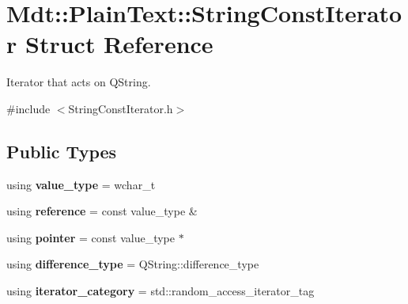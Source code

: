 \hypertarget{struct_mdt_1_1_plain_text_1_1_string_const_iterator}{}\section{Mdt\+:\+:Plain\+Text\+:\+:String\+Const\+Iterator Struct Reference}
\label{struct_mdt_1_1_plain_text_1_1_string_const_iterator}


Iterator that acts on Q\+String.  




{\ttfamily \#include $<$String\+Const\+Iterator.\+h$>$}

\subsection*{Public Types}
\begin{DoxyCompactItemize}
\item 
using {\bfseries value\+\_\+type} = wchar\+\_\+t\hypertarget{struct_mdt_1_1_plain_text_1_1_string_const_iterator_a7e1ae907965f67c75612084704ec088e}{}\label{struct_mdt_1_1_plain_text_1_1_string_const_iterator_a7e1ae907965f67c75612084704ec088e}

\item 
using {\bfseries reference} = const value\+\_\+type \&\hypertarget{struct_mdt_1_1_plain_text_1_1_string_const_iterator_af82db9ca141a662faca14ca6ea9141eb}{}\label{struct_mdt_1_1_plain_text_1_1_string_const_iterator_af82db9ca141a662faca14ca6ea9141eb}

\item 
using {\bfseries pointer} = const value\+\_\+type $\ast$\hypertarget{struct_mdt_1_1_plain_text_1_1_string_const_iterator_a91d7552b8c434c5547440923a4c703f7}{}\label{struct_mdt_1_1_plain_text_1_1_string_const_iterator_a91d7552b8c434c5547440923a4c703f7}

\item 
using {\bfseries difference\+\_\+type} = Q\+String\+::difference\+\_\+type\hypertarget{struct_mdt_1_1_plain_text_1_1_string_const_iterator_aba1dfab1726b2495f4c2ec53236c4796}{}\label{struct_mdt_1_1_plain_text_1_1_string_const_iterator_aba1dfab1726b2495f4c2ec53236c4796}

\item 
using {\bfseries iterator\+\_\+category} = std\+::random\+\_\+access\+\_\+iterator\+\_\+tag\hypertarget{struct_mdt_1_1_plain_text_1_1_string_const_iterator_a59211ba19c6e58545be363427cd52321}{}\label{struct_mdt_1_1_plain_text_1_1_string_const_iterator_a59211ba19c6e58545be363427cd52321}

\end{DoxyCompactItemize}
